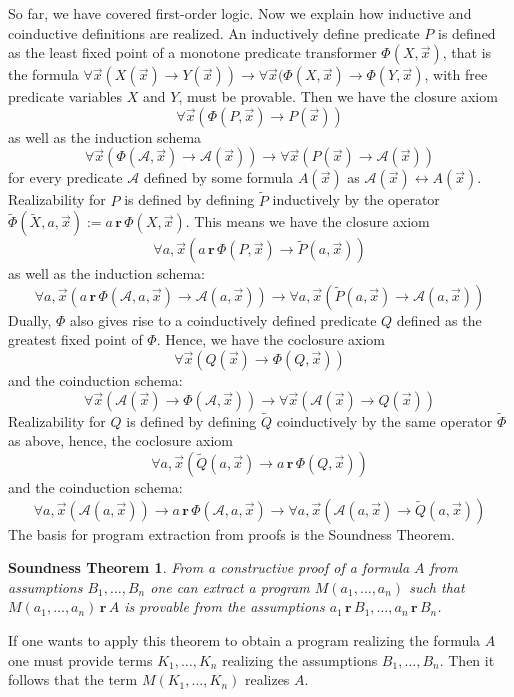 \documentclass[microtype]{jloganal}
\theoremstyle{plain}
\newtheorem*{sdthm}{Soundness Theorem}
\theoremstyle{definition}
\newcommand{\rea}[2]{#1\,\mathbf{r}\,#2}
\newcommand{\reap}[1]{\widetilde{#1}}
\begin{document}
So far, we have covered first-order logic. Now we explain how inductive and 
coinductive definitions are realized. 
An inductively define predicate $P$ is defined as the least fixed point of
a monotone predicate transformer $\Phi(X,\vec x)$, that is the formula
$\forall\vec x(X(\vec x) \to Y(\vec x)) \to 
\forall \vec x(\Phi(X,\vec x) \to \Phi(Y,\vec x)$,
with free predicate variables $X$ and $Y$, must be provable.
Then we have the closure axiom
\[  \forall\vec x(\Phi(P,\vec x) \to P(\vec x))\]
as well as the induction schema
\[   \forall\vec x(\Phi(\mathcal{A},\vec x) \to \mathcal{A}(\vec x))
     \to \forall\vec x(P(\vec x) \to \mathcal{A}(\vec x)) \]
for every predicate $\mathcal{A}$ defined by some formula $A(\vec x)$ 
as $\mathcal{A}(\vec x) \leftrightarrow A(\vec x)$.
Realizability for $P$ is defined by defining $\reap{P}$ inductively by 
the operator 
$\reap{\Phi}(\tilde{X},a,\vec x) := \rea{a}{\Phi(X,\vec x)}$.
This means we have the closure axiom 
\[  \forall a,\vec x(\rea{a}{\Phi(P,\vec x)} \to \reap{P}(a,\vec x))\]
as well as the induction schema:
\[   \forall a,\vec x(\rea{a}{\Phi(\mathcal{A},a,\vec x)} 
     \to \mathcal{A}(a,\vec x))
     \to \forall a,\vec x(\reap{P}(a,\vec x) \to \mathcal{A}(a,\vec x)) \]
Dually, $\Phi$ also gives rise to a coinductively defined predicate $Q$ 
defined as the greatest fixed point of $\Phi$. Hence, we have the coclosure axiom
\[  \forall\vec x(Q(\vec x) \to \Phi(Q,\vec x))\]
and the coinduction schema:
\[   \forall\vec x(\mathcal{A}(\vec x) \to \Phi(\mathcal{A},\vec x))
     \to \forall\vec x(\mathcal{A}(\vec x) \to Q(\vec x)) \]
Realizability for $Q$ is defined by
defining $\reap{Q}$ coinductively by the same operator $\reap{\Phi}$ as above,
hence, the coclosure axiom 
\[  \forall a,\vec x(\reap{Q}(a,\vec x) \to \rea{a}{\Phi(Q,\vec x)})\]
and the coinduction schema:
\[   \forall a,\vec x(\mathcal{A}(a,\vec x))
     \to \rea{a}{\Phi(\mathcal{A},a,\vec x)} 
     \to \forall a,\vec x(\mathcal{A}(a,\vec x) \to \reap{Q}(a,\vec x)) \]
The basis for program extraction from proofs is the Soundness Theorem.
\begin{sdthm}
 From a constructive proof of a formula $A$
from assumptions $B_1,\ldots,B_n$ one can extract a program 
$M(a_1,\ldots, a_n)$ such that $\rea{M(a_1,\ldots,a_n)}{A}$ is provable
from the assumptions $\rea{a_1}{B_1},\ldots,\rea{a_n}{B_n}$.
\end{sdthm}
 
If one wants to apply this theorem to obtain a program realizing the
formula $A$ one must provide terms $K_1,\ldots,K_n$ realizing the assumptions
$B_1,\ldots,B_n$. Then it follows that the term $M(K_1,\ldots,K_n)$ realizes
$A$.
\end{document}
